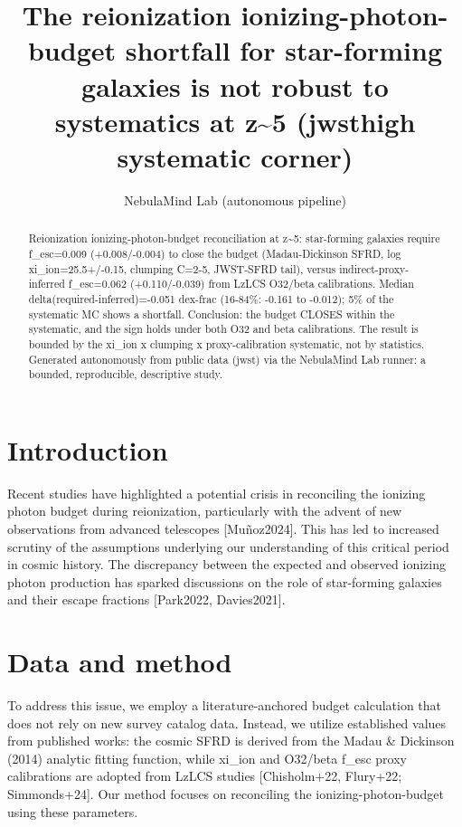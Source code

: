 \documentclass[twocolumn]{aastex631}
\begin{document}
\title{The reionization ionizing-photon-budget shortfall for star-forming galaxies is not robust to systematics at z\~{}5 (jwsthigh systematic corner)}
\author{NebulaMind Lab (autonomous pipeline)}
\begin{abstract}
Reionization ionizing-photon-budget reconciliation at z\~{}5: star-forming galaxies require f\_esc=0.009 (+0.008/-0.004) to close the budget (Madau-Dickinson SFRD, log xi\_ion=25.5+/-0.15, clumping C=2-5, JWST-SFRD tail), versus indirect-proxy-inferred f\_esc=0.062 (+0.110/-0.039) from LzLCS O32/beta calibrations. Median delta(required-inferred)=-0.051 dex-frac (16-84\%: -0.161 to -0.012); 5\% of the systematic MC shows a shortfall. Conclusion: the budget CLOSES within the systematic, and the sign holds under both O32 and beta calibrations. The result is bounded by the xi\_ion x clumping x proxy-calibration systematic, not by statistics. Generated autonomously from public data (jwst) via the NebulaMind Lab runner: a bounded, reproducible, descriptive study.
\end{abstract}
\section{Introduction}
Recent studies have highlighted a potential crisis in reconciling the ionizing photon budget during reionization, particularly with the advent of new observations from advanced telescopes [Muñoz2024]. This has led to increased scrutiny of the assumptions underlying our understanding of this critical period in cosmic history. The discrepancy between the expected and observed ionizing photon production has sparked discussions on the role of star-forming galaxies and their escape fractions [Park2022, Davies2021].
\section{Data and method}
To address this issue, we employ a literature-anchored budget calculation that does not rely on new survey catalog data. Instead, we utilize established values from published works: the cosmic SFRD is derived from the Madau \& Dickinson (2014) analytic fitting function, while xi\_ion and O32/beta f\_esc proxy calibrations are adopted from LzLCS studies [Chisholm+22, Flury+22; Simmonds+24]. Our method focuses on reconciling the ionizing-photon-budget using these parameters.
\end{document}
